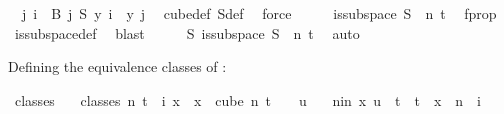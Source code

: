 \begin{isabellebody}
\ \ {\isacharparenleft}{\kern0pt}{\isasymforall}j{\isacharless}{\kern0pt}{}{\isachardot}{\kern0pt}\ {\isasymforall}i\ {\isasymin}\ B\ j{\isachardot}{\kern0pt}\ {\isacharparenleft}{\kern0pt}S\ y{\isacharparenright}{\kern0pt}\ i\ {\isacharequal}{\kern0pt}\ y\ j{\isacharparenright}{\kern0pt}{\isacharparenright}{\kern0pt}{\isachardoublequoteclose}\ \isamarkupfalse%
\ cube{\isacharunderscore}{\kern0pt}def\ S{\isacharunderscore}{\kern0pt}def\ \isamarkupfalse%
\ force\isanewline
\ \ \isamarkupfalse%
\ \isamarkupfalse%
\ {\isachardoublequoteopen}is{\isacharunderscore}{\kern0pt}subspace\ S\ {}\ n\ t{\isachardoublequoteclose}\ \isamarkupfalse%
\ f{\isacharunderscore}{\kern0pt}prop\ \isamarkupfalse%
\ is{\isacharunderscore}{\kern0pt}subspace{\isacharunderscore}{\kern0pt}def\ \isamarkupfalse%
\ blast\isanewline
\ \ \isamarkupfalse%
\ \isamarkupfalse%
\ {\isachardoublequoteopen}{\isasymexists}S{\isachardot}{\kern0pt}\ is{\isacharunderscore}{\kern0pt}subspace\ S\ {}\ n\ t{\isachardoublequoteclose}\ \isamarkupfalse%
\ auto\isanewline
{}\isamarkupfalse%
%
\endisatagproof
{\isafoldproof}%
%
\isadelimproof
%
\endisadelimproof
%
\isadelimdocument
%
\endisadelimdocument
%
\isatagdocument
%
\isamarkuptrue%
%
\endisatagdocument
{\isafolddocument}%
%
\isadelimdocument
%
\endisadelimdocument
%
\begin{isamarkuptext}%
Defining the equivalence classes of :
%
\end{isamarkuptext}\isamarkuptrue%
\isamarkupfalse%
\ classes\isanewline
\ \ \ {\isachardoublequoteopen}classes\ n\ t\ {\isasymequiv}\ {\isacharparenleft}{\kern0pt}{\isasymlambda}i{\isachardot}{\kern0pt}\ {\isacharbraceleft}{\kern0pt}x\ {\isachardot}{\kern0pt}\ x\ {\isasymin}\ {\isacharparenleft}{\kern0pt}cube\ n\ {\isacharparenleft}{\kern0pt}t\ {\isacharplus}{\kern0pt}\ {}{\isacharparenright}{\kern0pt}{\isacharparenright}{\kern0pt}\ {\isasymand}\ {\isacharparenleft}{\kern0pt}{\isasymforall}u\ {\isasymin}\isanewline
\ \ {\isacharbraceleft}{\kern0pt}{\isacharparenleft}{\kern0pt}n{\isacharminus}{\kern0pt}i{\isacharparenright}{\kern0pt}{\isachardot}{\kern0pt}{\isachardot}{\kern0pt}{\isacharless}{\kern0pt}n{\isacharbraceright}{\kern0pt}{\isachardot}{\kern0pt}\ x\ u\ {\isacharequal}{\kern0pt}\ t{\isacharparenright}{\kern0pt}\ {\isasymand}\ t\ {\isasymnotin}\ x\ {\isacharbackquote}{\kern0pt}\ {\isacharbraceleft}{\kern0pt}{\isachardot}{\kern0pt}{\isachardot}{\kern0pt}{\isacharless}{\kern0pt}{\isacharparenleft}{\kern0pt}n\ {\isacharminus}{\kern0pt}\ i{\isacharparenright}{\kern0pt}{\isacharbraceright}{\kern0pt}{\isacharbraceright}{\kern0pt}{\isacharparenright}{\kern0pt}{\isachardoublequoteclose}\isanewline

\end{isabellebody}

